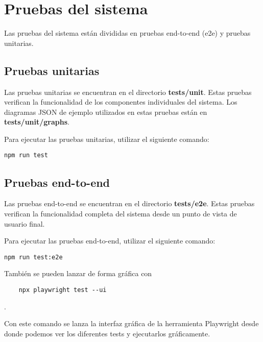 \section{Pruebas del sistema}
Las pruebas del sistema están divididas en pruebas end-to-end (e2e) y pruebas unitarias.

\subsection{Pruebas unitarias}
Las pruebas unitarias se encuentran en el directorio \textbf{tests/unit}. Estas pruebas verifican la funcionalidad de los componentes individuales del sistema. Los diagramas JSON de ejemplo utilizados en estas pruebas están en \textbf{tests/unit/graphs}.

Para ejecutar las pruebas unitarias, utilizar el siguiente comando:
\begin{verbatim}
npm run test
\end{verbatim}


\subsection{Pruebas end-to-end}
Las pruebas end-to-end se encuentran en el directorio \textbf{tests/e2e}. Estas pruebas verifican la funcionalidad completa del sistema desde un punto de vista de usuario final.

Para ejecutar las pruebas end-to-end, utilizar el siguiente comando:
\begin{verbatim}
npm run test:e2e
\end{verbatim}

También se pueden lanzar de forma gráfica con \begin{verbatim}
    npx playwright test --ui
\end{verbatim}.

Con este comando se lanza la interfaz gráfica de la herramienta Playwright \cite{playwright} desde donde podemos ver los diferentes tests y ejecutarlos gráficamente.



